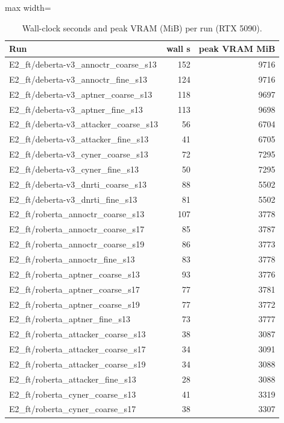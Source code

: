 \begin{table}[t]
\centering
\caption{Wall-clock seconds and peak VRAM (MiB) per run (RTX 5090).}
\label{tab:cost}
\small
\begin{adjustbox}{max width=\textwidth}
\begin{tabular}{lrr}
\toprule
Run & wall s & peak VRAM MiB \\
\midrule
E2\_ft/deberta-v3\_annoctr\_coarse\_s13 & 152 & 9716 \\
E2\_ft/deberta-v3\_annoctr\_fine\_s13 & 124 & 9716 \\
E2\_ft/deberta-v3\_aptner\_coarse\_s13 & 118 & 9697 \\
E2\_ft/deberta-v3\_aptner\_fine\_s13 & 113 & 9698 \\
E2\_ft/deberta-v3\_attacker\_coarse\_s13 & 56 & 6704 \\
E2\_ft/deberta-v3\_attacker\_fine\_s13 & 41 & 6705 \\
E2\_ft/deberta-v3\_cyner\_coarse\_s13 & 72 & 7295 \\
E2\_ft/deberta-v3\_cyner\_fine\_s13 & 50 & 7295 \\
E2\_ft/deberta-v3\_dnrti\_coarse\_s13 & 88 & 5502 \\
E2\_ft/deberta-v3\_dnrti\_fine\_s13 & 81 & 5502 \\
E2\_ft/roberta\_annoctr\_coarse\_s13 & 107 & 3778 \\
E2\_ft/roberta\_annoctr\_coarse\_s17 & 85 & 3787 \\
E2\_ft/roberta\_annoctr\_coarse\_s19 & 86 & 3773 \\
E2\_ft/roberta\_annoctr\_fine\_s13 & 83 & 3778 \\
E2\_ft/roberta\_aptner\_coarse\_s13 & 93 & 3776 \\
E2\_ft/roberta\_aptner\_coarse\_s17 & 77 & 3781 \\
E2\_ft/roberta\_aptner\_coarse\_s19 & 77 & 3772 \\
E2\_ft/roberta\_aptner\_fine\_s13 & 73 & 3777 \\
E2\_ft/roberta\_attacker\_coarse\_s13 & 38 & 3087 \\
E2\_ft/roberta\_attacker\_coarse\_s17 & 34 & 3091 \\
E2\_ft/roberta\_attacker\_coarse\_s19 & 34 & 3088 \\
E2\_ft/roberta\_attacker\_fine\_s13 & 28 & 3088 \\
E2\_ft/roberta\_cyner\_coarse\_s13 & 41 & 3319 \\
E2\_ft/roberta\_cyner\_coarse\_s17 & 38 & 3307 \\

\end{tabular}
\end{adjustbox}
\end{table}

